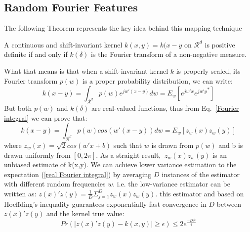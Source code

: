 \subsection{Random Fourier Features}
The following Theorem represents the key idea behind this mapping technique
\begin{theorem}
A continuous and shift-invariant kernel $k(x,y)=k(x-y$ on $\mathcal{R}^d$ is positive definite if and only if $k(\delta)$ is the Fourier transform of a non-negative measure.
\end{theorem}
What that means is that when a shift-invariant kernel $k$ is properly scaled, its Fourier transform $p(w)$ is a proper probability distribution, we can write:
\begin{equation}
\label{Fourier integral}
k(x-y)=\int_{\mathcal{R}^d}p(w)e^{j{w}'(x-y)}dw=E_w[e^{j{w}'x}{e^{j{w}'y}}^*]
\end{equation}
But both $p(w)$ and $k(\delta)$ are real-valued functions, thus from Eq.~\ref{Fourier integral} we can prove that:
\begin{equation}
\label{real Fourier integral}
k(x-y)=\int_{\mathcal{R}^d}p(w)cos({{w}'(x-y)})dw=E_w[z_w(x)z_w(y)]
\end{equation}
where $z_w(x)=\sqrt{2}cos({w}'x+b)$ such that $w$ is drawn from $p(w)$ and b is drawn uniformly from $[0,2\pi]$.\newline
As a straight result, $\ z_w(x)z_w(y)$ is an unbiased estimate of k(x,y). We can achieve lower variance estimation to the expectation (\ref{real Fourier integral}) by averaging $D$ instances of the estimator with different random frequencies $w$. i.e. the low-variance estimator can be written as: $z(x)'z(y)=\frac{1}{D} \Sigma_{j=1}^D z_w(x)z_w(y)$. this estimator and based on Hoeffding's inequality guarantees exponentially fast convergence in $D$ between $z(x)'z(y)$ and the kernel true value:
\begin{equation}
    Pr(|z(x)'z(y)-k(x,y)|\geq\epsilon)\leq2e^\frac{-D\epsilon^2}{4}
\end{equation}

